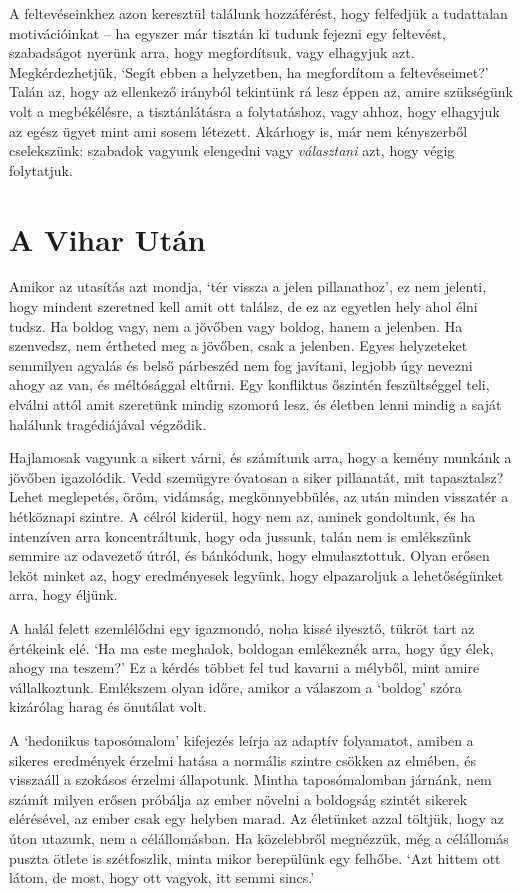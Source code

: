 A feltevéseinkhez azon keresztül találunk hozzáférést, hogy felfedjük a
tudattalan motivációinkat -- ha egyszer már tisztán ki tudunk fejezni
egy feltevést, szabadságot nyerünk arra, hogy megfordítsuk, vagy
elhagyjuk azt. Megkérdezhetjük, `Segít ebben a helyzetben, ha
megfordítom a feltevéseimet?' Talán az, hogy az ellenkező irányból
tekintünk rá lesz éppen az, amire szükségünk volt a megbékélésre, a
tisztánlátásra a folytatáshoz, vagy ahhoz, hogy elhagyjuk az egész ügyet
mint ami sosem létezett. Akárhogy is, már nem kényszerből cselekszünk:
szabadok vagyunk elengedni vagy \emph{választani} azt, hogy végig
folytatjuk.

\section{A Vihar Után}

Amikor az utasítás azt mondja, `tér vissza a jelen pillanathoz', ez nem
jelenti, hogy mindent szeretned kell amit ott találsz, de ez az egyetlen
hely ahol élni tudsz. Ha boldog vagy, nem a jövőben vagy boldog, hanem a
jelenben. Ha szenvedsz, nem értheted meg a jövőben, csak a jelenben.
Egyes helyzeteket semmilyen agyalás és belső párbeszéd nem fog javítani,
legjobb úgy nevezni ahogy az van, és méltósággal eltűrni. Egy konfliktus
őszintén feszültséggel teli, elválni attól amit szeretünk mindig szomorú
lesz, és életben lenni mindig a saját halálunk tragédiájával végződik.

Hajlamosak vagyunk a sikert várni, és számítunk arra, hogy a kemény
munkánk a jövőben igazolódik. Vedd szemügyre óvatosan a siker
pillanatát, mit tapasztalsz? Lehet meglepetés, öröm, vidámság,
megkönnyebbülés, az után minden visszatér a hétköznapi szintre. A célról
kiderül, hogy nem az, aminek gondoltunk, és ha intenzíven arra
koncentráltunk, hogy oda jussunk, talán nem is emlékszünk semmire az
odavezető útról, és bánkódunk, hogy elmulasztottuk. Olyan erősen leköt
minket az, hogy eredményesek legyünk, hogy elpazaroljuk a lehetőségünket
arra, hogy éljünk.

A halál felett szemlélődni egy igazmondó, noha kissé ilyesztő, tükröt
tart az értékeink elé. `Ha ma este meghalok, boldogan emlékeznék arra,
hogy úgy élek, ahogy ma teszem?' Ez a kérdés többet fel tud kavarni a
mélyből, mint amire vállalkoztunk. Emlékszem olyan időre, amikor a
válaszom a `boldog' szóra kizárólag harag és önutálat volt.

A `hedonikus taposómalom' kifejezés leírja az adaptív folyamatot, amiben
a sikeres eredmények érzelmi hatása a normális szintre csökken az
elmében, és visszaáll a szokásos érzelmi állapotunk. Mintha
taposómalomban járnánk, nem számít milyen erősen próbálja az ember
növelni a boldogság szintét sikerek elérésével, az ember csak egy
helyben marad. Az életünket azzal töltjük, hogy az úton utazunk, nem a
célállomásban. Ha közelebbről megnézzük, még a célállomás puszta ötlete
is szétfoszlik, minta mikor berepülünk egy felhőbe. `Azt hittem ott
látom, de most, hogy ott vagyok, itt semmi sincs.'

